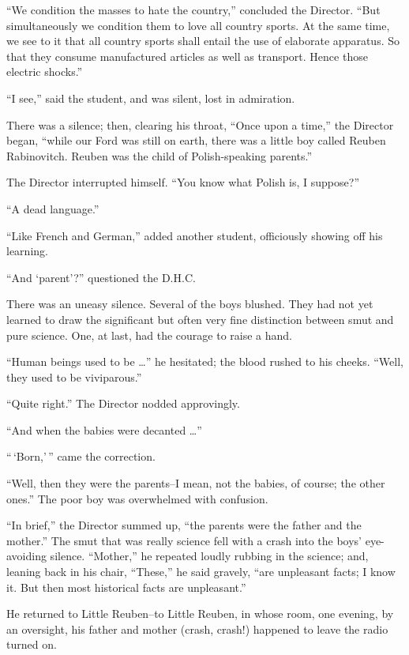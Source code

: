 \documentclass[12pt]{report}
\begin{document}
``We condition the masses to hate the country,'' concluded the Director.
``But simultaneously we condition them to love all country sports. At
the same time, we see to it that all country sports shall entail the use
of elaborate apparatus. So that they consume manufactured articles as
well as transport. Hence those electric shocks.''

``I see,'' said the student, and was silent, lost in admiration.

There was a silence; then, clearing his throat, ``Once upon a time,''
the Director began, ``while our Ford was still on earth, there was a
little boy called Reuben Rabinovitch. Reuben was the child of
Polish-speaking parents.''

The Director interrupted himself. ``You know what Polish is, I
suppose?''

``A dead language.''

``Like French and German,'' added another student, officiously showing
off his learning.

``And `parent'?'' questioned the D.H.C.

There was an uneasy silence. Several of the boys blushed. They had not
yet learned to draw the significant but often very fine distinction
between smut and pure science. One, at last, had the courage to raise a
hand.

``Human beings used to be \ldots{}'' he hesitated; the blood rushed to
his cheeks. ``Well, they used to be viviparous.''

``Quite right.'' The Director nodded approvingly.

``And when the babies were decanted \ldots{}''

``\,`Born,'\,'' came the correction.

``Well, then they were the parents--I mean, not the babies, of course;
the other ones.'' The poor boy was overwhelmed with confusion.

``In brief,'' the Director summed up, ``the parents were the father and
the mother.'' The smut that was really science fell with a crash into
the boys' eye-avoiding silence. ``Mother,'' he repeated loudly rubbing
in the science; and, leaning back in his chair, ``These,'' he said
gravely, ``are unpleasant facts; I know it. But then most historical
facts are unpleasant.''

He returned to Little Reuben--to Little Reuben, in whose room, one
evening, by an oversight, his father and mother (crash, crash!) happened
to leave the radio turned on.
\end{document}
